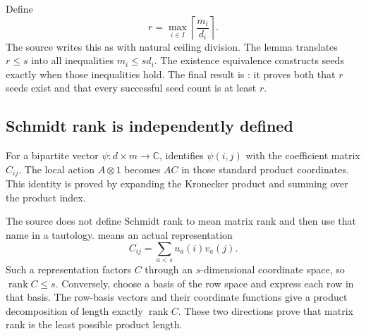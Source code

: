 
Define
\[
r=\max_{i\in I}\left\lceil\frac{m_i}{d_i}\right\rceil.
\]
The source writes this as  with natural ceiling division. The lemma  translates $r\le s$ into all inequalities $m_i\le sd_i$. The existence equivalence constructs seeds exactly when those inequalities hold. The final result is : it proves both that $r$ seeds exist and that every successful seed count is at least $r$.



\subsection{Schmidt rank is independently defined}
For a bipartite vector $\psi:d\times m\to\mathbb C$,  identifies $\psi(i,j)$ with the coefficient matrix $C_{ij}$. The local action $A\otimes 1$ becomes $AC$ in those standard product coordinates. This identity is proved by expanding the Kronecker product and summing over the product index.


The source does not define Schmidt rank to mean matrix rank and then use that name in a tautology.  means an actual representation
\[
C_{ij}=\sum_{a<s}u_a(i)v_a(j).
\]
Such a representation factors $C$ through an $s$-dimensional coordinate space, so $\operatorname{rank}C\le s$. Conversely, choose a basis of the row space and express each row in that basis. The row-basis vectors and their coordinate functions give a product decomposition of length exactly $\operatorname{rank}C$. These two directions prove that matrix rank is the least possible product length.

